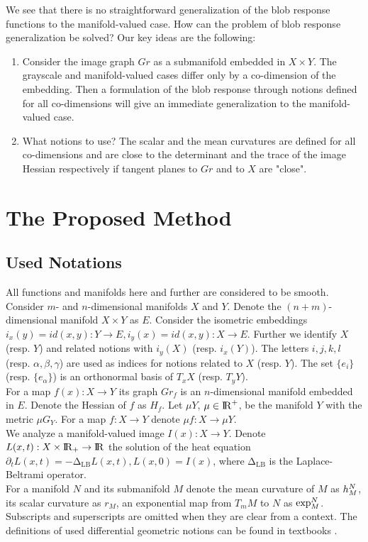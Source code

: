 \documentclass{llncs}
\newcommand{\LaplaceBeltrami}{\mathrm{\Delta_{{LB}}}}
\newcommand{\partderiv}[2]{\partial_{#2} {#1}}
\newcommand{\toreal}{\rightarrow\bbbr}
\newcommand{\TangentSpaceArg}[2]{{T_{#2}}{#1}}
\begin{document}
We see that there is no straightforward generalization of the blob response functions to the manifold-valued case. How can the problem of blob response generalization be solved? Our key ideas are the following:

\begin{enumerate}
\item	Consider the image graph $Gr$ as a submanifold embedded in $X\times Y$. The grayscale and manifold-valued cases differ only by a co-dimension of the embedding. Then a formulation of the blob response through notions defined for all co-dimensions will give an immediate generalization to the manifold-valued case. 
\item	What notions to use? The scalar and the mean curvatures are defined for all co-dimensions and are close to the determinant and the trace of the image Hessian respectively if tangent planes to $Gr$ and to $X$ are "close".
\end{enumerate}

\section{The Proposed Method}
\subsection{Used Notations}
All functions and manifolds here and further are considered to be smooth. Consider $m$- and $n$-dimensional manifolds $X$ and $Y$. Denote the $(n+m)$-dimensional manifold $X\times Y$ as $E$. Consider the isometric embeddings $i_x(y)=id(x, y):Y\to E, i_y(x)=id(x, y):X\to E$. Further we identify $X$ (resp. $Y$) and related notions with $i_y(X)$ (resp. $i_x(Y)$). The letters $i,j,k,l$ (resp. $\alpha, \beta, \gamma$) are used as indices for notions related to $X$ (resp. $Y$). The set $\{e_i\}$ (resp. $\{e_\alpha\}$) is an orthonormal basis of $T_x X$ (resp. $T_y Y$). 
\\
For a map $f(x):X\to Y$ its graph $Gr_f$ is an $n$-dimensional manifold embedded in $E$. Denote the Hessian of $f$ as $H_f$. Let $\mu Y$, $\mu \in {\rm I\!R}^{+}$, be the manifold $Y$ with the metric $\mu G_Y$. For a map $f:X\to Y$ denote $\mu f:X\to \mu Y$.
\\
We analyze a manifold-valued image $I(x):X \to Y$. Denote $L(x,t):X\times \bbbr_{+} \toreal$ the solution of the heat equation $\partderiv{L(x, t)}{t}=-\LaplaceBeltrami{ L(x, t)},L(x, 0)=I(x)$, where $\LaplaceBeltrami$ is the Laplace-Beltrami operator. 
\\
For a manifold $N$ and its submanifold $M$ denote the mean curvature of $M$ as $\tensor*{h}{^{N}_{M}}$, its scalar curvature as $r_M$, an exponential map from $\TangentSpaceArg{M}{m}$ to $N$ as $\tensor*{\exp}{^N_{M}}$.
\\
Subscripts and superscripts are omitted when they are clear from a context. The definitions of used differential geometric notions can be found in textbooks \cite{DiffGeom}.
\end{document}
